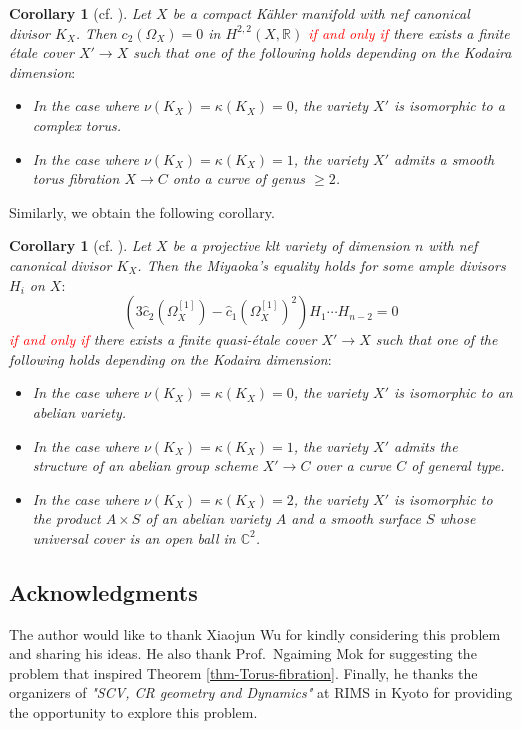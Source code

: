 \documentclass[12pt]{amsart}
\newtheorem{cor}[thm]{Corollary}
\theoremstyle{definition}
\theoremstyle{remark}
\numberwithin{equation}{section}
\newcommand{\R}{\mathbb{R}}
\newcommand{\xr}[1]{\textcolor{red}{#1}}
\begin{document}
\begin{cor}[cf. \cite{IM22}]
Let $X$ be a compact K\"ahler manifold  with nef canonical divisor $K_{X}$. 
Then $c_2(\Omega_{X})=0$ in $H^{2,2}(X,\R)$ \xr{if and only if}
there exists a finite \'etale cover $X'\rightarrow X$ such that one of the following holds depending on the Kodaira dimension$:$
\begin{itemize}
\item[$(i)$] In the case where $\nu(K_{X})=\kappa(K_{X})=0$, 
the variety $X'$ is isomorphic to a complex torus. 
\item[$(ii)$] In the case where $\nu(K_{X})=\kappa(K_{X})=1$, 
the variety $X'$ admits a smooth torus fibration $X \to C$ onto a curve of genus $\ge 2$.
\end{itemize}
\end{cor}
Similarly, we obtain the following corollary.
\begin{cor}[cf. \cite{IMM24}]
Let $X$ be a projective klt variety of dimension $n$ with nef canonical divisor $K_{X}$. Then the Miyaoka's equality holds for some ample divisors $H_i$ on $X$$:$
\begin{equation*}
\label{eq-miyaoka}
 \left( 3 \widehat{c}_2(\Omega_{X}^{[1]}) - \widehat{c}_1(\Omega_{X}^{[1]})^2 \right)
H_1\cdots H_{n-2}=0
\end{equation*}
\xr{if and only if} there exists a finite quasi-\'etale cover $X'\rightarrow X$ such that one of the following holds depending on the Kodaira dimension$:$
\begin{itemize}
\item[$(i)$] In the case where $\nu(K_{X})=\kappa(K_{X})=0$, 
the variety $X'$ is isomorphic to an abelian variety. 

\item[$(ii)$] In the case where $\nu(K_{X})=\kappa(K_{X})=1$, 
the variety $X'$ admits the structure of an abelian group scheme $X' \rightarrow C$ over a curve $C$ of general type.


\item[$(iii)$] In the case where $\nu(K_{X})=\kappa(K_{X})=2$, the variety $X'$ is isomorphic to the product $A \times S$ of an abelian variety $A$ 
and a smooth surface $S$ whose universal cover is an open ball in $\mathbb{C}^{2}$. 
\end{itemize}
\end{cor}

\subsection*{Acknowledgments}
The author would like to thank Xiaojun Wu for kindly considering this problem and sharing his ideas.  
He also thank Prof.\, Ngaiming Mok for suggesting the problem that inspired Theorem \ref{thm-Torus-fibration}.  
Finally, he thanks the organizers of \textit{"SCV, CR geometry and Dynamics"} at RIMS in Kyoto for providing the opportunity to explore this problem.


\end{document}
